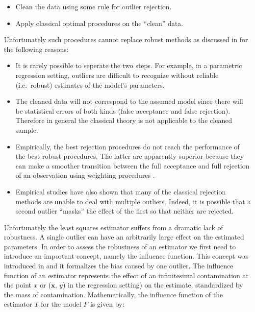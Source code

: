 \documentclass[]{book}
\providecommand{\tightlist}{%
  \setlength{\itemsep}{0pt}\setlength{\parskip}{0pt}}
\theoremstyle{definition}
\theoremstyle{definition}
\theoremstyle{definition}
\theoremstyle{remark}
\begin{document}
\begin{itemize}
\tightlist
\item
  Clean the data using some rule for outlier rejection.
\item
  Apply classical optimal procedures on the ``clean'' data.
\end{itemize}

Unfortunately such procedures cannot replace robust methods as discussed
in \citet{huber2009robust} for the following reasons:

\begin{itemize}
\tightlist
\item
  It is rarely possible to seperate the two steps. For example, in a
  parametric regression setting, outliers are difficult to recognize
  without reliable (i.e.~robust) estimates of the model's parameters.
\item
  The cleaned data will not correspond to the assumed model since there
  will be statistical errors of both kinds (false acceptance and false
  rejection). Therefore in general the classical theory is not
  applicable to the cleaned sample.
\item
  Empirically, the best rejection procedures do not reach the
  performance of the best robust procedures. The latter are apparently
  superior because they can make a smoother transition between the full
  acceptance and full rejection of an observation using weighting
  procedures \citet{hampel1987robust}.
\item
  Empirical studies have also shown that many of the classical rejection
  methods are unable to deal with multiple outliers. Indeed, it is
  possible that a second outlier ``masks'' the effect of the first so
  that neither are rejected.
\end{itemize}

Unfortunately the least squares estimator suffers from a dramatic lack
of robustness. A single outlier can have an arbitrarily large effect on
the estimated parameters. In order to assess the robustness of an
estimator we first need to introduce an important concept, namely the
influence function. This concept was introduced in
\citet{hampel1968contributions} and it formalizes the bias caused by one
outlier. The influence function of an estimator represents the effect of
an infinitesimal contamination at the point \(x\) or (\(\mathbf{x}\),
\(y\)) in the regression setting) on the estimate, standardized by the
mass of contamination. Mathematically, the influence function of the
estimator \(T\) for the model \(F\) is given by:
\end{document}
